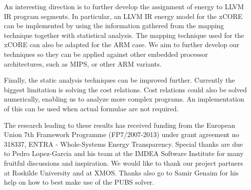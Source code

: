 \documentclass[9pt,preprint]{sigplanconf}
\begin{document}
An interesting direction is to further develop the assignment of
energy to LLVM IR program segments. In particular, an LLVM IR energy model for
the xCORE can be implemented by using the information gathered from the mapping
technique together with statistical analysis. The mapping technique used for the xCORE
can also be adapted for the ARM case. We  aim to further develop our
techniques so they can be applied against other embedded
processor architectures, such as MIPS, or other ARM variants.

Finally, the static analysis techniques can be improved further. Currently the biggest
limitation is solving the cost relations. Cost relations could also be
solved numerically, enabling us to analyze more complex programs. An
implementation of this can be used when actual formulae are not
required.

\acks
The research leading to these results has received funding from the European
Union 7th Framework Programme (FP7/2007-2013) under grant agreement no 318337,
ENTRA - Whole-Systems Energy Transparency. Special thanks are due to Pedro
Lopez-Garcia and his team at the IMDEA Software Institute for many fruitful
discussions and inspiration. We would like to thank our project
partners at Roskilde University and at XMOS. Thanks also go to Samir Genaim
for his help on how to best make use of the PUBS solver.



\end{document}
